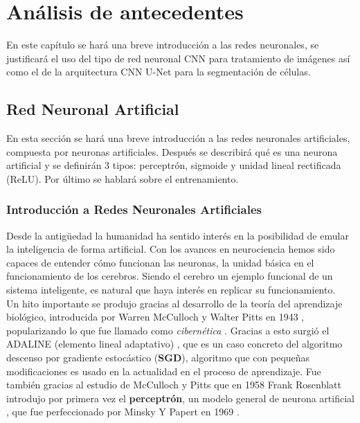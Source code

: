 \chapter{An\'alisis de antecedentes}\label{analanteced}

En este capítulo se hará una breve introducción a las redes neuronales, se justificará el uso del tipo de red neuronal CNN para tratamiento de imágenes así como el de la arquitectura CNN U-Net para la segmentación de células.

\section{Red Neuronal Artificial}\label{sec:redneuronal}

En esta sección se hará una breve introducción a las redes neuronales artificiales, compuesta por neuronas artificiales. Después se describirá qué es una neurona artificial y se definirán 3 tipos: perceptrón, sigmoide y unidad lineal rectificada (ReLU). Por último se hablará sobre el entrenamiento.

\subsection{Introducción a Redes Neuronales Artificiales}\label{subsec:nn_intro}

Desde la antigüedad la humanidad ha sentido interés en la posibilidad de emular la inteligencia de forma artificial. Con los avances en neurociencia hemos sido capaces de entender cómo funcionan las neuronas, la unidad básica en el funcionamiento de los cerebros. Siendo el cerebro un ejemplo funcional de un sistema inteligente, es natural  que haya interés en replicar su funcionamiento.\\

Un hito importante se produjo gracias al desarrollo de la teoría del aprendizaje biológico, introducida por Warren McCulloch y Walter Pitts en 1943 \cite{McCulloch1943}, popularizando lo que fue llamado como \emph{cibernética} \cite[p13]{Goodfellow2016}. Gracias a esto surgió el ADALINE (elemento lineal adaptativo) \cite{Widrow2015}, que es un caso concreto del algoritmo descenso por gradiente estocástico (\textbf{SGD}), algoritmo que con pequeñas modificaciones es usado en la actualidad en el proceso de aprendizaje\cite[p14]{Goodfellow2016}. Fue también gracias al estudio de McCulloch y Pitts que en 1958 Frank Rosenblatt introdujo por primera vez el \textbf{perceptrón}, un modelo general de neurona artificial \cite{Rosenblatt1958}, que fue perfeccionado por Minsky Y Papert en 1969 \cite{Minsky1969}.

